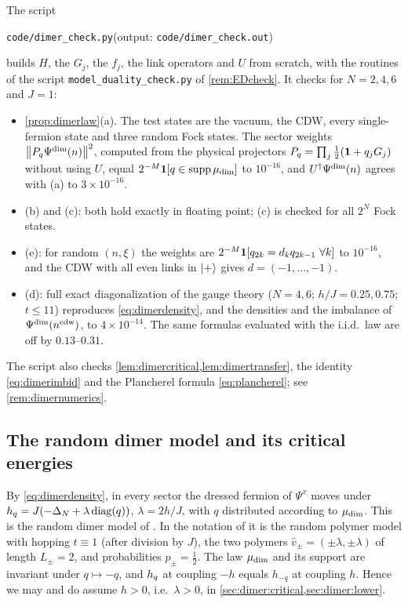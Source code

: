 \begin{remark}\label{rem:dimerED}
The script
\begin{center}
\texttt{code/dimer\_check.py}\quad(output: \texttt{code/dimer\_check.out})
\end{center}
builds $H$, the $G_j$, the $f_j$, the link operators and $U$ from scratch, with the routines of the
script \texttt{model\_duality\_check.py} of \cref{rem:EDcheck}.  It checks for $N=2,4,6$ and $J=1$:
\begin{itemize}
\item \cref{prop:dimerlaw}(a).  The test states are the vacuum, the CDW, every single-fermion state
and three random Fock states.  The sector weights $\left\|P_q\Psi^{\mathrm{dim}}(n)\right\|^2$, computed from the physical
projectors $P_q=\prod_j\frac12(\mathbf{1}+q_jG_j)$ without using $U$, equal $2^{-M}\mathbf{1}[q\in\operatorname{supp}\mu_{\mathrm{dim}}]$ to
$10^{-16}$, and $U^\dagger\Psi^{\mathrm{dim}}(n)$ agrees with (a) to $3\times10^{-16}$.
\item (b) and (c): both hold exactly in floating point; (c) is checked for all $2^N$ Fock states.
\item (e): for random $(n,\xi)$ the weights are $2^{-M}\mathbf{1}[q_{2k}=d_kq_{2k-1}\ \forall k]$ to
$10^{-16}$, and the CDW with all even links in $|+\rangle$ gives $d=(-1,\dots,-1)$.
\item (d): full exact diagonalization of the gauge theory ($N=4,6$; $h/J=0.25,0.75$; $t\le11$)
reproduces \eqref{eq:dimerdensity}, and the densities and the imbalance of $\Psi^{\mathrm{dim}}(n^{\mathrm{cdw}})$, to
$4\times10^{-14}$.  The same formulas evaluated with the i.i.d.\ law are off by $0.13$--$0.31$.
\end{itemize}
The script also checks \cref{lem:dimercritical,lem:dimertransfer}, the identity
\eqref{eq:dimerimbid} and the Plancherel formula \eqref{eq:plancherel}; see
\cref{rem:dimernumerics}.
\end{remark}

\subsection{The random dimer model and its critical energies}\label{sec:dimer:critical}

By \eqref{eq:dimerdensity}, in every sector the dressed fermion of $\Psi^x$ moves under
$h_{q}=J(-\Delta_N+\lambda\operatorname{diag}(q))$, $\lambda=2h/J$, with $q$ distributed according to $\mu_{\mathrm{dim}}$.  This
is the random dimer model of \cite{DWP1990}.  In the notation of \cite[Eq.~(2)]{JSBS2003} it is the
random polymer model with hopping $t\equiv1$ (after division by $J$), the two polymers
$\hat v_\pm=(\pm\lambda,\pm\lambda)$ of length $L_\pm=2$, and probabilities $p_\pm=\frac12$.  The law
$\mu_{\mathrm{dim}}$ and its support are invariant under $q\mapsto-q$, and $h_{q}$ at coupling $-h$ equals $h_{-q}$
at coupling $h$.  Hence we may and do assume $h>0$, i.e.\ $\lambda>0$, in
\cref{sec:dimer:critical,sec:dimer:lower}.

